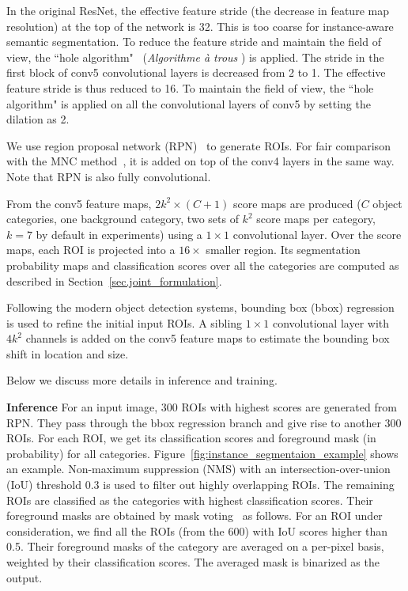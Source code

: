 \documentclass[10pt,twocolumn,letterpaper]{article}
\begin{document}
In the original ResNet, the effective feature stride (the decrease in feature map resolution) at the top of the network is 32. This is too coarse for instance-aware semantic segmentation. To reduce the feature stride and maintain the field of view, the ``hole algorithm"~\cite{chen2015semantic,long2015fully} (\emph{Algorithme \`{a} trous} \cite{mallat1999wavelet}) is applied. The stride in the first block of conv5 convolutional layers is decreased from 2 to 1. The effective feature stride is thus reduced to 16. To maintain the field of view, the ``hole algorithm" is applied on all the convolutional layers of conv5 by setting the dilation as 2.

We use region proposal network (RPN)~\cite{ren2015faster} to generate ROIs. For fair comparison with the MNC method~\cite{dai2016mnc}, it is added on top of the conv4 layers in the same way. Note that RPN is also fully convolutional.

From the conv5 feature maps, $2k^2\times (C+1)$ score maps are produced ($C$ object categories, one background category, two sets of $k^2$ score maps per category, $k=7$ by default in experiments) using a $1\times 1$ convolutional layer. Over the score maps, each ROI is projected into a $16\times$ smaller region. Its segmentation probability maps and classification scores over all the categories are computed as described in Section~\ref{sec.joint_formulation}.

Following the modern object detection systems, bounding box (bbox) regression~\cite{girshick2014rich,girshick2015fast} is used to refine the initial input ROIs. A sibling $1\times 1$ convolutional layer with $4k^2$ channels is added on the conv5 feature maps to estimate the bounding box shift in location and size.

Below we discuss more details in inference and training.

\textbf{Inference}
For an input image, $300$ ROIs with highest scores are generated from RPN. They pass through the bbox regression branch and give rise to another $300$ ROIs. For each ROI, we get its classification scores and foreground mask (in probability) for all categories. Figure~\ref{fig:instance_segmentaion_example} shows an example. Non-maximum suppression (NMS) with an intersection-over-union (IoU) threshold $0.3$ is used to filter out highly overlapping ROIs. The remaining ROIs are classified as the categories with highest classification scores. Their foreground masks are obtained by mask voting~\cite{dai2016mnc} as follows. For an ROI under consideration, we find all the ROIs (from the $600$) with IoU scores higher than 0.5. Their foreground masks of the category are averaged on a per-pixel basis, weighted by their classification scores. The averaged mask is binarized as the output.
\end{document}
